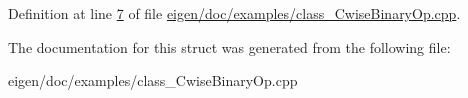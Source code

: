 Definition at line \hyperlink{eigen_2doc_2examples_2class___cwise_binary_op_8cpp_source_l00007}{7} of file \hyperlink{eigen_2doc_2examples_2class___cwise_binary_op_8cpp_source}{eigen/doc/examples/class\+\_\+\+Cwise\+Binary\+Op.\+cpp}.



The documentation for this struct was generated from the following file\+:\begin{DoxyCompactItemize}
\item 
eigen/doc/examples/class\+\_\+\+Cwise\+Binary\+Op.\+cpp\end{DoxyCompactItemize}
